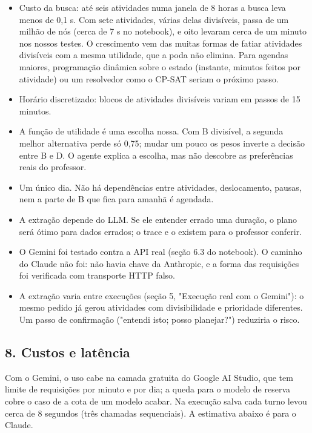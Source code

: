 \documentclass[12pt, a4paper]{article}
\providecommand{\tightlist}{%
  \setlength{\itemsep}{0pt}\setlength{\parskip}{0pt}}
\DeclareRobustCommand{\texttt}[1]{\breakabletexttt{#1}}
\begin{document}
\begin{itemize}
\tightlist
\item
  Custo da busca: até seis atividades numa janela de 8 horas a busca leva menos de 0,1 s. Com sete atividades, várias delas divisíveis, passa de um milhão de nós (cerca de 7 s no notebook), e oito levaram cerca de um minuto nos nossos testes. O crescimento vem das muitas formas de fatiar atividades divisíveis com a mesma utilidade, que a poda não elimina. Para agendas maiores, programação dinâmica sobre o estado (instante, minutos feitos por atividade) ou um resolvedor como o CP-SAT seriam o próximo passo.
\item
  Horário discretizado: blocos de atividades divisíveis variam em passos de 15 minutos.
\item
  A função de utilidade é uma escolha nossa. Com B divisível, a segunda melhor alternativa perde só 0,75; mudar um pouco os pesos inverte a decisão entre B e D. O agente explica a escolha, mas não descobre as preferências reais do professor.
\item
  Um único dia. Não há dependências entre atividades, deslocamento, pausas, nem a parte de B que fica para amanhã é agendada.
\item
  A extração depende do LLM. Se ele entender errado uma duração, o plano será ótimo para dados errados; o trace e o \texttt{/agenda} existem para o professor conferir.
\item
  O Gemini foi testado contra a API real (seção 6.3 do notebook). O caminho do Claude não foi: não havia chave da Anthropic, e a forma das requisições foi verificada com transporte HTTP falso.
\item
  A extração varia entre execuções (seção 5, "Execução real com o Gemini"): o mesmo pedido já gerou atividades com divisibilidade e prioridade diferentes. Um passo de confirmação ("entendi isto; posso planejar?") reduziria o risco.
\end{itemize}

\subsection{8. Custos e latência}\label{8-custos-e-latuxeancia}

Com o Gemini, o uso cabe na camada gratuita do Google AI Studio, que tem limite de requisições por minuto e por dia; a queda para o modelo de reserva cobre o caso de a cota de um modelo acabar. Na execução salva cada turno levou cerca de 8 segundos (três chamadas sequenciais). A estimativa abaixo é para o Claude.
\end{document}
